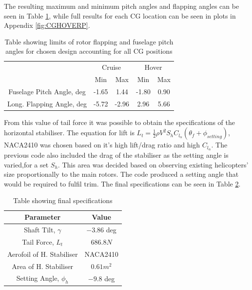 \documentclass[11pt,a4paper]{article}
\begin{document}
The resulting maximum and minimum pitch angles and flapping angles can be seen in Table \ref{tab:cgres}, while full results for each CG location can be seen in plots in Appendix \ref{fig:CGHOVERP}.
\begin{table}[H]
\centering
\caption{Table showing limits of rotor flapping and fuselage pitch angles for chosen design accounting for all CG positions}
\begin{tabular}{c|c|c|c|c|}
\cline{2-5}
                                                & \multicolumn{2}{c}{\cellcolor[HTML]{DAE8FC}Cruise}                             & \multicolumn{2}{c|}{\cellcolor[HTML]{DAE8FC}Hover}        \\ \cline{2-5} 
                                                & \multicolumn{1}{c|}{\cellcolor[HTML]{DAE8FC}Min} & \cellcolor[HTML]{DAE8FC}Max & \cellcolor[HTML]{DAE8FC}Min & \cellcolor[HTML]{DAE8FC}Max \\ \hline
\multicolumn{1}{|c|}{Fuselage Pitch Angle, deg} & \multicolumn{1}{c|}{-1.65}                       & 1.44                        & -1.80                       & 0.90                        \\ \hline
\multicolumn{1}{|c|}{Long. Flapping Angle, deg} & \multicolumn{1}{c|}{-5.72}                       & -2.96                       & 2.96                        & 5.66                        \\ \hline
\end{tabular}
\label{tab:cgres}
\end{table}
From this value of tail force it was possible to obtain the specifications of the horizontal stabiliser. The equation for lift is $L_t=\frac{1}{2}\rho V^2 S_h C_{l_\alpha}(\theta_f+\phi_{setting})$, NACA2410 was chosen based on it's high lift/drag ratio and high $C_{l_\alpha}$. The previous code also included the drag of the stabiliser as the setting angle is varied,for a set $S_h$. This area was decided based on observing existing helicopters' size proportionally to the main rotors. The code produced a setting angle that would be required to fulfil trim. The final specifications can be seen in Table \ref{tab:longfinal}.

\begin{table}[H]
\centering 
    \caption{Table showing final specifications}
\begin{tabular}{cc}
\hline
  \rowcolor[HTML]{DAE8FC} 
  Parameter & Value \\ \hline
   Shaft Tilt, $\gamma$ & $-3.86$ deg\\
   Tail Force, $L_t$ & $686.8N$\\
   Aerofoil of H. Stabiliser & NACA2410\\
   Area of H. Stabiliser & $0.61m^2$\\
   Setting Angle, $\phi_h$ & $-9.8$ deg\\
   \hline
\end{tabular}{}
    \label{tab:longfinal}
\end{table}{}
\end{document}

